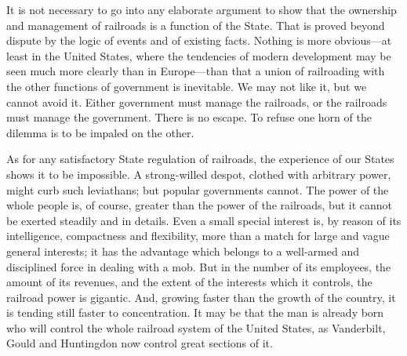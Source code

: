 \documentclass{book}
\begin{document}
It is not necessary to go into any elaborate argument to show that the ownership and management of railroads is a function of the State. That is proved beyond dispute by the logic of events and of existing facts. Nothing is more obvious—at least in the United States, where the tendencies of modern development may be seen much more clearly than in Europe—than that a union of railroading with the other functions of government is inevitable. We may not like it, but we cannot avoid it. Either government must manage the railroads, or the railroads must manage the government. There is no escape. To refuse one horn of the dilemma is to be impaled on the other.

As for any satisfactory State regulation of railroads, the experience of our States shows it to be impossible. A strong-willed despot, clothed with arbitrary power, might curb such leviathans; but popular governments cannot. The power of the whole people is, of course, greater than the power of the railroads, but it cannot be exerted steadily and in details. Even a small special interest is, by reason of its intelligence, compactness and flexibility, more than a match for large and vague general interests; it has the advantage which belongs to a well-armed and disciplined force in dealing with a mob. But in the number of its employees, the amount of its revenues, and the extent of the interests which it controls, the railroad power is gigantic. And, growing faster than the growth of the country, it is tending still faster to concentration. It may be that the man is already born who will control the whole railroad system of the United States, as Vanderbilt, Gould and Huntingdon now control great sections of it.
\end{document}
